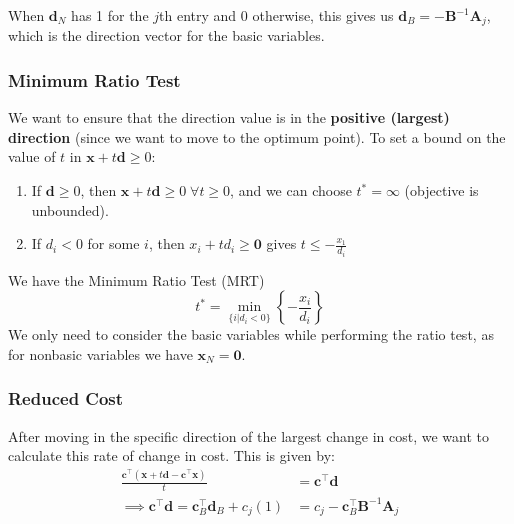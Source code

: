 \documentclass{article}
\begin{document}
\noindent When $\mathbf{d}_N$ has 1 for the $j$th entry and 0 otherwise, this gives us $\mathbf{d}_B = - \mathbf{B}^{-1}\mathbf{A}_j$, which is the direction vector for the basic variables. 

\subsubsection{Minimum Ratio Test}
We want to ensure that the direction value is in the \textbf{positive (largest) direction} (since we want to move to the optimum point). To set a bound on the value of $t$ in $\mathbf{x} + t \mathbf{d}\geq 0$: \begin{enumerate}
    \item If $\mathbf{d} \geq 0$, then $\mathbf{x} + t \mathbf{d} \geq 0 \; \forall t \geq 0$, and we can choose $t^{*} = \infty$ (objective is unbounded). 
    \item If $d_i <0$ for some $i$, then $x_i + td_i \geq \mathbf{0}$ gives $t \leq - \frac{x_1}{d_i}$  
\end{enumerate}

\begin{definition}
    We have the Minimum Ratio Test (MRT) \begin{equation*}
        t^{*} = \min_{\{i | d_i < 0\}} \left\{ -\frac{x_i}{d_i}\right\}
    \end{equation*} We only need to consider the basic variables while performing the ratio test, as for nonbasic variables we have $\mathbf{x}_N = \mathbf{0}$. 
\end{definition}

\subsubsection{Reduced Cost}

After moving in the specific direction of the largest change in cost, we want to calculate this rate of change in cost. This is given by: \begin{align*}
    \frac{\mathbf{c}^{\top}(\mathbf{x} + t \mathbf{d} - \mathbf{c}^{\top} \mathbf{x})}{t} &= \mathbf{c}^{\top}\mathbf{d} \\ 
    \implies \mathbf{c}^{\top} \mathbf{d} = \mathbf{c}^{\top}_B \mathbf{d}_B + c_j (1) &= c_j - \mathbf{c}^{\top}_B \mathbf{B}^{-1}\mathbf{A}_j
\end{align*}
\end{document}
